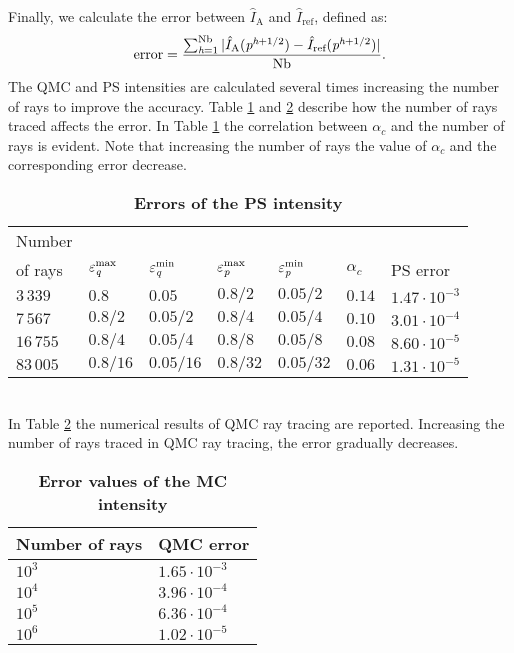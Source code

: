 Finally, we calculate the error between $\hat{I}_{\textrm{A}}$ and $\hat{I}_{\textrm{ref}}$, defined as:
\begin{equation}\label{eq:error}
\mbox{error} = \frac{\sum_{\textit{h}= 1}^{\textrm{Nb}}| \hat{I}_{\textrm{A}}(\textit{p}^{\textit{h}+1/2}) - \hat{I}_{\textrm{ref}}(\textit{p}^{\textit{h}+1/2})|}{\textrm{Nb}}.
\end{equation}
The QMC and PS intensities are calculated several times increasing the number of rays to improve the accuracy.
Table \ref{tab:table} and \ref{tab:table2} describe how the number of rays traced affects the error. 
In Table \ref{tab:table} the correlation between $\alpha_c$ and the number of rays is evident.
Note that increasing the number of rays the value of $\alpha_c$ and the corresponding error decrease. 
\begin{table}[htbp] \label{tab:table}
\centering
\caption{\bf Errors of the PS intensity}
\begin{tabular}{lllllll}
 \hline  Number \\ of rays\;  & $\varepsilon^{\textrm{max}}_{\textit{q}} $  & $\varepsilon^{\textrm{min}}_{\textit{q}} $   \;     & $\varepsilon^{\textrm{max}}_{\textit{p}}$\;
  & $\varepsilon^{\textrm{min}}_{\textit{p}}$\; & $\alpha_c$  & PS error \\
  \hline 
 $3\,339$ & $0.8$  & $0.05$  & $0.8/2$  & $0.05/2$ & $0.14$ & $1.47\cdot10^{-3}$ \\
$7\,567$  & $0.8/2$  & $0.05/2$  & $0.8/4$  & $0.05/4$ & $0.10$ & $3.01\cdot 10^{-4}$  \\
$16\,755$  & $0.8/4$  & $0.05/4$  & $0.8/8$  & $0.05/8$ & $0.08$ & $8.60\cdot 10^{-5}$ \\
 $83\,005$ & $0.8/16$  & $0.05/16$  & $0.8/32$  & $0.05/32$ & $0.06$ & $1.31\cdot 10^{-5}$ \\
 \hline
 \end{tabular}
 \label{tab:table}
 \end{table}
\\ \indent In Table \ref{tab:table2} the numerical results of QMC ray tracing are reported.
Increasing the number of rays traced in QMC ray tracing, the error gradually decreases.
\begin{table}[htbp]
\centering
\caption{\bf Error values of the MC intensity}
\begin{tabular}{ll} \hline   Number of rays\; & QMC error\\
 \hline $10^3$  & $1.65\cdot10^{-3}$ \\
$10^4$  & $3.96\cdot 10^{-4}$  \\
 $10^5$  & $6.36\cdot 10^{-4}$ \\ 
$10^6$  & $1.02\cdot 10^{-5}$ \\
 \hline
 \end{tabular}
 \label{tab:table2}
 \end{table}
